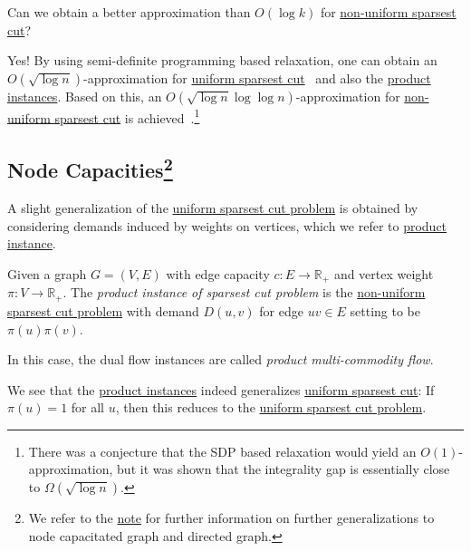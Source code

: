 \begin{problem*}
	Can we obtain a better approximation than \(O(\log k)\) for \hyperref[prb:non-uniform-sparsest-cut]{non-uniform sparsest cut}?
\end{problem*}
\begin{answer}
	Yes! By using semi-definite programming based relaxation, one can obtain an \(O(\sqrt{\log n} )\)-approximation for \hyperref[prb:sparsest-cut]{uniform sparsest cut}~\cite{arora2009expander} and also the \hyperref[prb:product-instance-of-sparsest-cut]{product instances}. Based on this, an \(O(\sqrt{\log n} \log \log n )\)-approximation for \hyperref[prb:non-uniform-sparsest-cut]{non-uniform sparsest cut} is achieved~\cite{arora2005euclidean,arora2007frechet}.\footnote{There was a conjecture that the SDP based relaxation would yield an \(O(1)\)-approximation, but it was shown that the integrality gap is essentially close to \(\Omega (\sqrt{\log n} )\).}
\end{answer}

\subsection{Node Capacities\footnote{We refer to the \href{https://courses.grainger.illinois.edu/cs598csc/fa2024/Notes/lec-sparsest-cut.pdf}{note} for further information on further generalizations to node capacitated graph and directed graph.}}
A slight generalization of the \hyperref[prb:sparsest-cut]{uniform sparsest cut problem} is obtained by considering demands induced by weights on vertices, which we refer to \hyperref[prb:product-instance-of-sparsest-cut]{product instance}.

\begin{problem}\label{prb:product-instance-of-sparsest-cut}
Given a graph \(G = (V, E)\) with edge capacity \(c \colon E \to \mathbb{R} _+\) and vertex weight \(\pi \colon V \to \mathbb{R} _+\). The \emph{product instance of sparsest cut problem} is the \hyperref[prb:non-uniform-sparsest-cut]{non-uniform sparsest cut problem} with demand \(D(u, v)\) for edge \(uv \in E\) setting to be \(\pi (u) \pi (v)\).
\end{problem}

\begin{notation}
	In this case, the dual flow instances are called \emph{product multi-commodity flow}.
\end{notation}

We see that the \hyperref[prb:product-instance-of-sparsest-cut]{product instances} indeed generalizes \hyperref[prb:sparsest-cut]{uniform sparsest cut}: If \(\pi (u) = 1\) for all \(u\), then this reduces to the \hyperref[prb:sparsest-cut]{uniform sparsest cut problem}.

